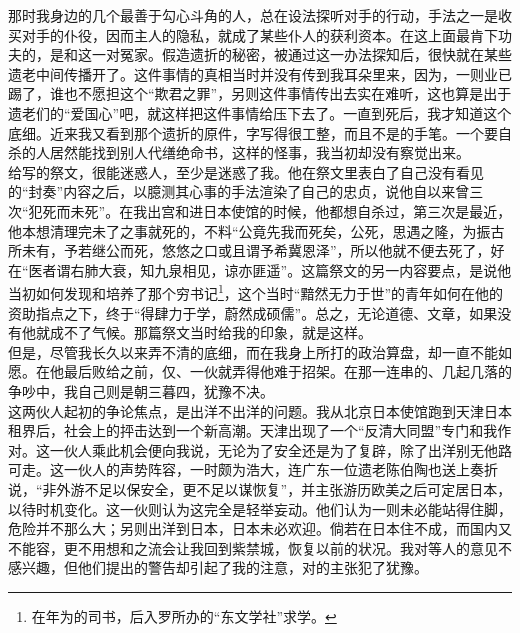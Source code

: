 那时我身边的几个最善于勾心斗角的人，总在设法探听对手的行动，手法之一是收买对手的仆役，因而主人的隐私，就成了某些仆人的获利资本。在这上面最肯下功夫的，是和这一对冤家。假造遗折的秘密，被通过这一办法探知后，很快就在某些遗老中间传播开了。这件事情的真相当时并没有传到我耳朵里来，因为，一则业已踢了，谁也不愿担这个“欺君之罪”，另则这件事情传出去实在难听，这也算是出于遗老们的“爱国心”吧，就这样把这件事情给压下去了。一直到死后，我才知道这个底细。近来我又看到那个遗折的原件，字写得很工整，而且不是的手笔。一个要自杀的人居然能找到别人代缮绝命书，这样的怪事，我当初却没有察觉出来。\\

给写的祭文，很能迷惑人，至少是迷惑了我。他在祭文里表白了自己没有看见的“封奏”内容之后，以臆测其心事的手法渲染了自己的忠贞，说他自以来曾三次“犯死而未死”。在我出宫和进日本使馆的时候，他都想自杀过，第三次是最近，他本想清理完未了之事就死的，不料“公竟先我而死矣，公死，思遇之隆，为振古所未有，予若继公而死，悠悠之口或且谓予希冀恩泽”，所以他就不便去死了，好在“医者谓右肺大衰，知九泉相见，谅亦匪遥”。这篇祭文的另一内容要点，是说他当初如何发现和培养了那个穷书记\footnote{在年为的司书，后入罗所办的“东文学社”求学。}，这个当时“黯然无力于世”的青年如何在他的资助指点之下，终于“得肆力于学，蔚然成硕儒”。总之，无论道德、文章，如果没有他就成不了气候。那篇祭文当时给我的印象，就是这样。\\

但是，尽管我长久以来弄不清的底细，而在我身上所打的政治算盘，却一直不能如愿。在他最后败给之前，仅、一伙就弄得他难于招架。在那一连串的、几起几落的争吵中，我自己则是朝三暮四，犹豫不决。\\

这两伙人起初的争论焦点，是出洋不出洋的问题。我从北京日本使馆跑到天津日本租界后，社会上的抨击达到一个新高潮。天津出现了一个“反清大同盟”专门和我作对。这一伙人乘此机会便向我说，无论为了安全还是为了复辟，除了出洋别无他路可走。这一伙人的声势阵容，一时颇为浩大，连广东一位遗老陈伯陶也送上奏折说，“非外游不足以保安全，更不足以谋恢复”，并主张游历欧美之后可定居日本，以待时机变化。这一伙则认为这完全是轻举妄动。他们认为一则未必能站得住脚，危险并不那么大；另则出洋到日本，日本未必欢迎。倘若在日本住不成，而国内又不能容，更不用想和之流会让我回到紫禁城，恢复以前的状况。我对等人的意见不感兴趣，但他们提出的警告却引起了我的注意，对的主张犯了犹豫。\\

